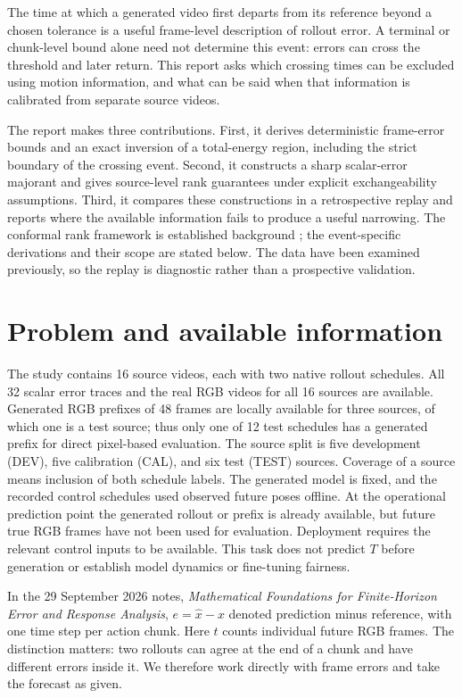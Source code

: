 \documentclass[11pt]{article}
\theoremstyle{noteplain}
\begin{document}
The time at which a generated video first departs from its reference beyond a chosen tolerance is a useful frame-level description of rollout error. A terminal or chunk-level bound alone need not determine this event: errors can cross the threshold and later return. This report asks which crossing times can be excluded using motion information, and what can be said when that information is calibrated from separate source videos.

The report makes three contributions. First, it derives deterministic frame-error bounds and an exact inversion of a total-energy region, including the strict boundary of the crossing event. Second, it constructs a sharp scalar-error majorant and gives source-level rank guarantees under explicit exchangeability assumptions. Third, it compares these constructions in a retrospective replay and reports where the available information fails to produce a useful narrowing. The conformal rank framework is established background \cite{vovk2005,diquigiovanni2021}; the event-specific derivations and their scope are stated below. The data have been examined previously, so the replay is diagnostic rather than a prospective validation.

\section{Problem and available information}\label{sec:problem}
The study contains 16 source videos, each with two native rollout schedules. All 32 scalar error traces and the real RGB videos for all 16 sources are available. Generated RGB prefixes of 48 frames are locally available for three sources, of which one is a test source; thus only one of 12 test schedules has a generated prefix for direct pixel-based evaluation. The source split is five development (DEV), five calibration (CAL), and six test (TEST) sources. Coverage of a source means inclusion of both schedule labels. The generated model is fixed, and the recorded control schedules used observed future poses offline. At the operational prediction point the generated rollout or prefix is already available, but future true RGB frames have not been used for evaluation. Deployment requires the relevant control inputs to be available. This task does not predict $T$ before generation or establish model dynamics or fine-tuning fairness.

In the 29 September 2026 notes, \emph{Mathematical Foundations for Finite-Horizon Error and Response Analysis}, $e=\widehat x-x$ denoted prediction minus reference, with one time step per action chunk. Here $t$ counts individual future RGB frames. The distinction matters: two rollouts can agree at the end of a chunk and have different errors inside it. We therefore work directly with frame errors and take the forecast as given.
\end{document}
